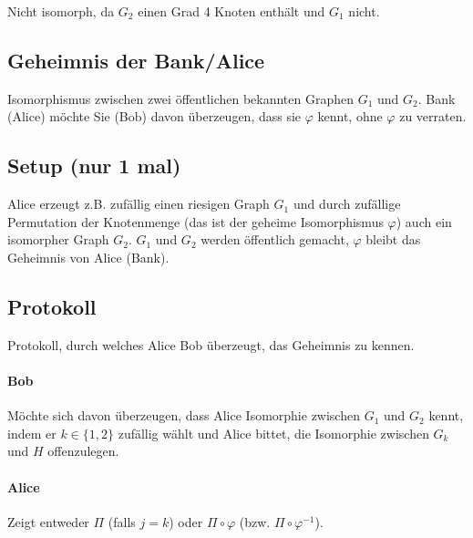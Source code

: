 Nicht isomorph, da $G_2$ einen Grad 4 Knoten enthält und $G_1$ nicht.


\subsection{Geheimnis der Bank/Alice} Isomorphismus zwischen zwei öffentlichen bekannten Graphen $G_1$ und $G_2$. Bank (Alice) möchte Sie (Bob) davon überzeugen, dass sie $\varphi$ kennt, ohne $\varphi$ zu verraten.

\subsection{Setup (nur 1 mal)}
Alice erzeugt z.B. zufällig einen riesigen Graph $G_1$  und durch zufällige Permutation der Knotenmenge (das ist der geheime Isomorphismus $\varphi$) auch ein isomorpher Graph $G_2$. $G_1$ und $G_2$ werden öffentlich gemacht, $\varphi$ bleibt das Geheimnis von Alice (Bank).

\subsection{Protokoll}
Protokoll, durch welches Alice Bob überzeugt, das Geheimnis zu kennen.


\paragraph*{Bob} Möchte sich davon überzeugen, dass Alice Isomorphie zwischen $G_1$ und $G_2$ kennt, indem er $k \in \{ 1,2 \}$ zufällig wählt und Alice bittet, die Isomorphie zwischen $G_k$ und $H$ offenzulegen.

\paragraph*{Alice} Zeigt entweder $\Pi$ (falls $j=k$) oder $\Pi \circ \varphi$ (bzw. $\Pi \circ \varphi^{-1}$).



